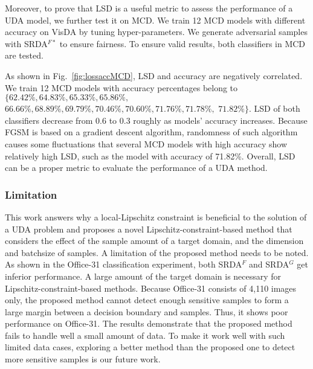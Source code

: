 \documentclass[journal,twocolumn]{IEEEtran}
\theoremstyle{definition}
\begin{document}
Moreover, to prove that LSD is a useful metric to assess the performance of a UDA model, we further test it on MCD. We train 12 MCD models with different accuracy on VisDA by tuning hyper-parameters. We generate adversarial samples with SRDA$^{F*}$ to ensure fairness. To ensure valid results, both classifiers in MCD are tested.

As shown in Fig.~\ref{fig:lossaccMCD}, LSD and accuracy are negatively correlated. We train 12 MCD models with accuracy percentages belong to $\{62.42\%, 64.83\%, 65.33\%, 65.86\%,$ $ 66.66\%, 68.89\%, 69.79\%, 70.46\%, 70.60\%, 71.76\%, 71.78\%, $ $71.82\%\}$. LSD of both classifiers decrease from 0.6 to 0.3 roughly as models' accuracy increases. Because FGSM is based on a gradient descent algorithm, randomness of such algorithm causes some fluctuations that several MCD models with high accuracy show relatively high LSD, such as the model with accuracy of 71.82\%.  Overall, LSD can be a proper metric to evaluate the performance of a UDA method.

\subsubsection{Limitation}
This work answers why a local-Lipschitz constraint is beneficial to the solution of a UDA problem and proposes a novel Lipschitz-constraint-based method that considers the effect of the sample amount of a target domain, and the dimension and batchsize of samples. A limitation of the proposed method needs to be noted. As shown in the Office-31 classification experiment, both SRDA$^F$ and SRDA$^G$ get inferior performance. A large amount of the target domain is necessary for Lipschitz-constraint-based methods. Because Office-31 consists of 4,110 images only, the proposed method cannot detect enough sensitive samples to form a large margin between  a decision boundary and samples. Thus, it shows poor performance on Office-31.  The results demonstrate that the proposed method fails to handle well a small amount of data. To make it work well with such limited data cases, exploring a better method than the proposed one to detect more sensitive samples is our future work.
\end{document}
